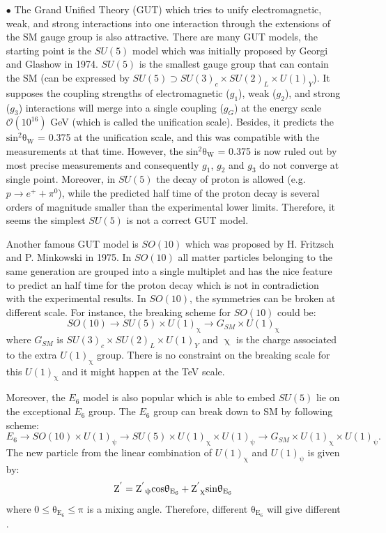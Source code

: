 \begin{enumerate}
\item[$\bullet$] The Grand Unified Theory (GUT) \cite{Altar:1989,Leike,Rizzo} which tries to unify electromagnetic, weak, and strong interactions into one interaction through the extensions of the SM gauge group is also attractive. There are many GUT models, the starting point is the $SU(5)$ \cite{Glashow} model which was initially proposed by Georgi and Glashow in 1974. $SU(5)$ is the smallest gauge group that can contain the SM (can be expressed by $SU(5)\supset SU(3)_c \times SU(2)_L \times U(1)_Y$). It supposes the coupling strengths of electromagnetic ($g_1$), weak ($g_2$), and strong ($g_3$) interactions will merge into a single coupling ($g_G$) at the energy scale $\mathcal{O}(10^{16})$ GeV (which is called the unification scale). Besides, it predicts the $\mathrm{sin^2\theta_W}$ = 0.375 at the unification scale, and this was compatible with the measurements at that time. However, the $\mathrm{sin^2\theta_W}$ = 0.375 is now ruled out by most precise measurements and consequently $g_1$, $g_2$ and $g_3$ do not converge at single point. Moreover, in $SU(5)$ the decay of proton is allowed (e.g. $p\rightarrow e^{+}+\pi^0$), while the predicted half time of the proton decay is several orders of magnitude smaller than the experimental lower limits. Therefore, it seems the simplest $SU(5)$ is not a correct GUT model.

    Another famous GUT model is $SO(10)$ \cite{King:1981ge} which was proposed by H. Fritzsch and P. Minkowski in 1975. In $SO(10)$ all matter particles belonging to the same generation are grouped into a single multiplet and has the nice feature to predict an half time for the proton decay which is not in contradiction with the experimental results. In $SO(10)$, the symmetries can be broken at different scale. For instance, the breaking scheme for $SO(10)$ could be:
    $$SO(10)\rightarrow SU(5)\times U(1)_\upchi\rightarrow G_{SM}\times U(1)_\upchi$$
    where $G_{SM}$ is $SU(3)_c \times SU(2)_L \times U(1)_Y$ and $\upchi$ is the charge associated to the extra $U(1)_\upchi$ group. There is no constraint on the breaking scale for this $U(1)_\upchi$ and it might happen at the TeV scale.


Moreover, the $E_{6}$ model \cite{Witten:1985xc} is also popular which is able to embed $SU(5)$ lie on the exceptional $E_{6}$ group. The $E_{6}$ group can break down to SM by following scheme:
$$E_6\rightarrow SO(10) \times U(1)_\uppsi \rightarrow SU(5)\times U(1)_\upchi \times U(1)_\uppsi\rightarrow G_{SM}\times U(1)_\upchi \times U(1)_\uppsi.$$
The new particle \ZP from the linear combination of $U(1)_\upchi$ and $U(1)_\uppsi$ is given by:
$$\mathrm{Z^{'}}=\mathrm{\mathrm{Z^{'}}_\mathrm{\uppsi} cos\uptheta_{E_6} + \mathrm{Z^{'}}_\mathrm{\upchi} sin\uptheta_{E_6}}$$
where  $\mathrm{0\leq\theta_{E_6}\leq\pi}$ is a mixing angle. Therefore, different $\mathrm{\theta_{E_6}}$ will give different \ZP.



\end{enumerate}
